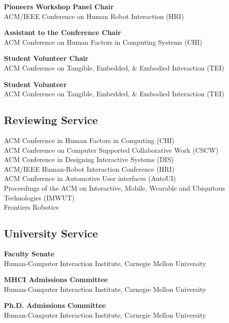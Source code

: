 \documentclass[11pt]{article} %
\begin{document}
 \textbf{Pioneers Workshop Panel Chair}\\
ACM/IEEE Conference on Human Robot Interaction (HRI)
\medskip

 \textbf{Assistant to the Conference Chair}\\
ACM Conference on Human Factors in Computing Systems (CHI)\\
\medskip

 \textbf{Student Volunteer Chair}\\
ACM Conference on Tangible, Embedded, \& Embodied Interaction (TEI)\\
\medskip

 \textbf{Student Volunteer}\\
ACM Conference on Tangible, Embedded, \& Embodied Interaction (TEI)\\
\medskip

\subsection*{Reviewing Service}
ACM Conference in Human Factors in Computing (CHI)\\
ACM Conference on Computer Supported Collaborative Work (CSCW)\\
ACM Conference in Designing Interactive Systems (DIS)\\
ACM/IEEE Human-Robot Interaction Conference (HRI)\\
ACM Conference in Automotive User interfaces (AutoUI)\\
Proceedings of the ACM on Interactive, Mobile, Wearable and Ubiquitous Technologies (IMWUT)\\
Frontiers Robotics\\


\subsection*{University Service}

 \textbf{Faculty Senate}\\
Human-Computer Interaction Institute, Carnegie Mellon University
\medskip

 \textbf{MHCI Admissions Committee}\\
Human-Computer Interaction Institute, Carnegie Mellon University
\medskip

 \textbf{Ph.D. Admissions Committee}\\
Human-Computer Interaction Institute, Carnegie Mellon University
\medskip
\end{document}
